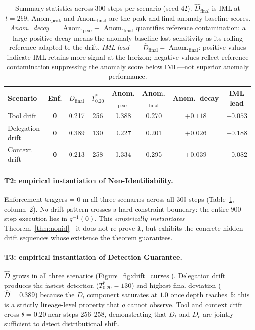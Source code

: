 \documentclass[11pt]{article}
\newcommand{\Dhat}{\widehat{D}}
\begin{document}
\begin{table}[h]
\centering
\caption{Summary statistics across 300 steps per scenario (seed 42).
         $\Dhat_{\text{final}}$ is IML at $t=299$; Anom.$_{\text{peak}}$ and
         Anom.$_{\text{final}}$ are the peak and final anomaly baseline scores.
         \emph{Anom.\ decay} $=$ Anom.$_{\text{peak}} -$ Anom.$_{\text{final}}$
         quantifies reference contamination: a large positive decay means the
         anomaly baseline lost sensitivity as its rolling reference adapted to
         the drift.  \emph{IML lead} $=$ $\Dhat_{\text{final}} -$
         Anom.$_{\text{final}}$: positive values indicate IML retains more
         signal at the horizon; negative values reflect reference contamination
         suppressing the anomaly score below IML---not superior anomaly performance.}
\label{tab:results}
\small
\begin{tabular}{@{}lccccccc@{}}
\toprule
Scenario & Enf. & $\Dhat_{\text{final}}$ & $T^*_{0.20}$
         & Anom.$_{\text{peak}}$ & Anom.$_{\text{final}}$ & Anom.\ decay & IML lead \\
\midrule
Tool drift       & \textbf{0} & 0.217 & 256 & 0.388 & 0.270 & $+0.118$ & $-0.053$ \\
Delegation drift & \textbf{0} & 0.389 & 130 & 0.227 & 0.201 & $+0.026$ & $+0.188$ \\
Context drift    & \textbf{0} & 0.213 & 258 & 0.334 & 0.295 & $+0.039$ & $-0.082$ \\
\bottomrule
\end{tabular}
\end{table}

\paragraph{T2: empirical instantiation of Non-Identifiability.}
Enforcement triggers = 0 in all three scenarios across all 300 steps
(Table~\ref{tab:results}, column~2).  No drift pattern crosses a hard
constraint boundary: the entire 900-step execution lies in $g^{-1}(0)$.
This \emph{empirically instantiates} Theorem~\ref{thm:nonid}---it does not
re-prove it, but exhibits the concrete hidden-drift sequences whose existence
the theorem guarantees.

\paragraph{T3: empirical instantiation of Detection Guarantee.}
$\Dhat$ grows in all three scenarios (Figure~\ref{fig:drift_curves}).
Delegation drift produces the fastest detection ($T^*_{0.20} = 130$) and
highest final deviation ($\Dhat = 0.389$) because the $D_l$ component
saturates at $1.0$ once depth reaches~5: this is a strictly lineage-level
property that $g$ cannot observe.  Tool and context drift cross $\theta =
0.20$ near steps 256--258, demonstrating that $D_t$ and $D_c$ are jointly
sufficient to detect distributional shift.
\end{document}
